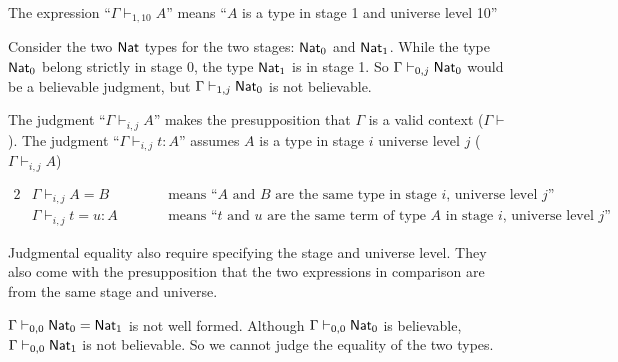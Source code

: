 \begin{example}
  The expression ``$\Gamma \vdash_{1, 10} A$'' means ``$A$ is a type in stage 1 and universe level 10''     
\end{example}


\begin{example}
    Consider the two $\mathsf{Nat}$ types for the two stages: $\mathsf{Nat}_0$ and $\mathsf{Nat}_1$. While the type $\mathsf{Nat}_0$ belong strictly in stage 0, the type $\mathsf{Nat}_1$ is in stage 1. 
    So $\Gamma \vdash_{0, j} \mathsf{Nat}_0$ would be a believable judgment, but $\Gamma \vdash_{1, j} \mathsf{Nat}_0$ is not believable.
\end{example}

The judgment ``$\Gamma \vdash_{i, j} A$'' makes the presupposition that $\Gamma$ is a valid context ($\Gamma \vdash$). The judgment ``$\Gamma \vdash_{i,j} t:A$'' assumes $A$ is a type in stage $i$ universe level $j$ ($\Gamma \vdash_{i, j} A$)

\begin{definition}
    \begin{alignat*}{2}
        &\Gamma \vdash_{i, j} A = B &&\text{means ``$A$ and $B$ are the same type in stage $i$, universe level $j$''} \\
        &\Gamma \vdash_{i, j} t=u:A \hspace{2em} &&\text{means ``$t$ and $u$ are the same term of type $A$ in stage $i$, universe level $j$''}
    \end{alignat*}
\end{definition}

Judgmental equality also require specifying the stage and universe level. They also come with the presupposition that the two expressions in comparison are from the same stage and universe.

\begin{example}
    $\Gamma \vdash_{0, 0} \mathsf{Nat}_0 = \mathsf{Nat}_1$ is not well formed. Although $\Gamma \vdash_{0, 0} \mathsf{Nat}_0$ is believable, $\Gamma \vdash_{0, 0} \mathsf{Nat}_1$ is not believable. So we cannot judge the equality of the two types. 
\end{example}
